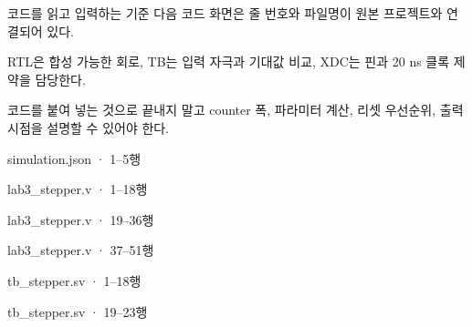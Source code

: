 \begin{frame}[label=code]{코드를 읽고 입력하는 기준}
\small
다음 코드 화면은 줄 번호와 파일명이 원본 프로젝트와 연결되어 있다.\par\vspace{0.25cm}
RTL은 합성 가능한 회로, TB는 입력 자극과 기대값 비교, XDC는 핀과 20 ns 클록 제약을 담당한다.\par\vspace{0.25cm}
코드를 붙여 넣는 것으로 끝내지 말고 counter 폭, 파라미터 계산, 리셋 우선순위, 출력 시점을 설명할 수 있어야 한다.
\end{frame}

\begin{frame}[fragile]{simulation.json · 1–5행}

\end{frame}

\begin{frame}[fragile]{lab3\_stepper.v · 1–18행}

\end{frame}

\begin{frame}[fragile]{lab3\_stepper.v · 19–36행}

\end{frame}

\begin{frame}[fragile]{lab3\_stepper.v · 37–51행}

\end{frame}

\begin{frame}[fragile]{tb\_stepper.sv · 1–18행}

\end{frame}

\begin{frame}[fragile]{tb\_stepper.sv · 19–23행}

\end{frame}

